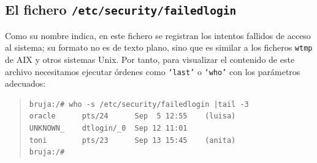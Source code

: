\subsection{El fichero {\tt /etc/security/failedlogin}}
Como su nombre indica, en este fichero se registran los intentos fallidos de
acceso al sistema; su formato no es de texto plano, sino que es similar a
los ficheros {\tt wtmp} de AIX y otros sistemas Unix. Por tanto, para 
visualizar el contenido de este archivo necesitamos ejecutar \'ordenes como 
{\tt `last'} o {\tt `who'} con los par\'ametros adecuados:
\begin{quote}
\begin{verbatim}
bruja:/# who -s /etc/security/failedlogin |tail -3
oracle      pts/24      Sep  5 12:55    (luisa)
UNKNOWN_    dtlogin/_0  Sep 12 11:01                    
toni        pts/23      Sep 13 15:45    (anita)
bruja:/# 
\end{verbatim}
\end{quote}
